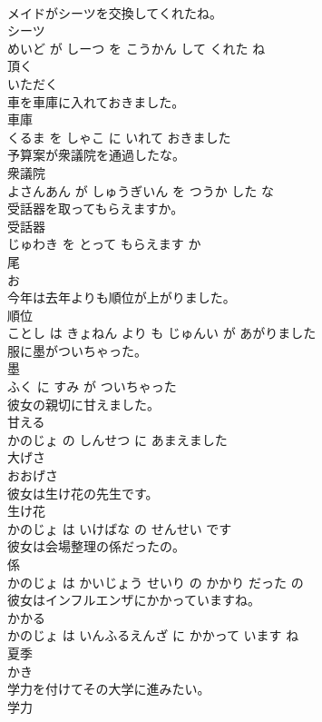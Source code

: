 \documentclass[8pt]{extreport}
\begin{document}
\begin{CJK}{UTF8}{min}
\\	メイドがシーツを交換してくれたね。	
\\	シーツ 
\\	めいど が しーつ を こうかん して くれた ね			
\\	頂く	
\\	いただく			
\\	車を車庫に入れておきました。	
\\	車庫 
\\	くるま を しゃこ に いれて おきました			
\\	予算案が衆議院を通過したな。	
\\	衆議院 
\\	よさんあん が しゅうぎいん を つうか した な			
\\	受話器を取ってもらえますか。	
\\	受話器 
\\	じゅわき を とって もらえます か			
\\	尾	
\\	お			
\\	今年は去年よりも順位が上がりました。	
\\	順位 
\\	ことし は きょねん より も じゅんい が あがりました			
\\	服に墨がついちゃった。	
\\	墨 
\\	ふく に すみ が ついちゃった			
\\	彼女の親切に甘えました。	
\\	甘える 
\\	かのじょ の しんせつ に あまえました			
\\	大げさ	
\\	おおげさ			
\\	彼女は生け花の先生です。	
\\	生け花 
\\	かのじょ は いけばな の せんせい です			
\\	彼女は会場整理の係だったの。	
\\	係 
\\	かのじょ は かいじょう せいり の かかり だった の			
\\	彼女はインフルエンザにかかっていますね。	
\\	かかる 
\\	かのじょ は いんふるえんざ に かかって います ね			
\\	夏季	
\\	かき			
\\	学力を付けてその大学に進みたい。	
\\	学力 

\end{CJK}
\end{document}
